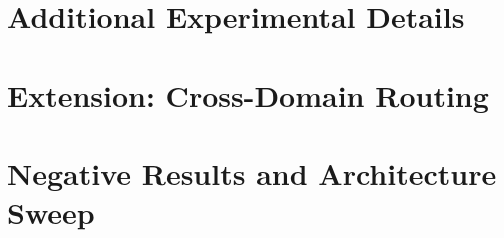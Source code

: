 \documentclass{article}
\begin{document}
\appendix

\section{Additional Experimental Details}
\label{app:details}


\section{Extension: Cross-Domain Routing}
\label{app:routing}


\section{Negative Results and Architecture Sweep}
\label{app:negative}

\end{document}
